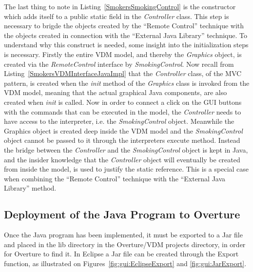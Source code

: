 \documentclass{overturerepchap}
\begin{document}
The last thing to note in Listing~\ref{SmokersSmokingControl} is the constructor which adds itself to a public static field in the \textit{Controller} class. This step is necessary to brigde the objects created by the ``Remote Control'' technique with the objects created in connection with the ``External Java Library'' technique. 
To understand why this construct is needed, some insight into the initialization steps is necessary. Firstly the entire VDM model, and thereby the \textit{Graphics} object, is created via the \textit{RemoteControl} interface by \textit{SmokingControl}. Now recall from Listing~\ref{SmokersVDMInterfaceJavaImpl} that the \textit{Controller} class, of the MVC pattern, is created when the \textit{init} method of the \textit{Graphics} class is invoked from the VDM model, meaning that the actual graphical Java components, are also created when \textit{init} is called. Now in order to connect a click on the GUI buttons with the commands that can be executed in the model, the \textit{Controller} needs to have access to the interpreter, i.e. the \textit{SmokingControl} object. Meanwhile the Graphics object is created deep inside the VDM model and the \textit{SmokingControl} object cannot be passed to it through the interpreters execute method. Instead the bridge between the \textit{Controller} and the \textit{SmokingControl} object is kept in Java, and the insider knowledge that the \textit{Controller} object will eventually be created from inside the model, is used  to justify the static reference. This is a special case when combining the ``Remote Control'' technique with the ``External Java Library'' method. \\

\subsection{Deployment of the Java Program to Overture}
Once the Java program has been implemented, it must be exported to a Jar file and placed in the lib directory in the Overture/VDM projects directory, in order for Overture to find it.
In Eclipse a Jar file can be created through the Export function, as illustrated on Figures~\ref{fig:gui:EclipseExport} and \ref{fig:gui:JarExport}. 
\end{document}
